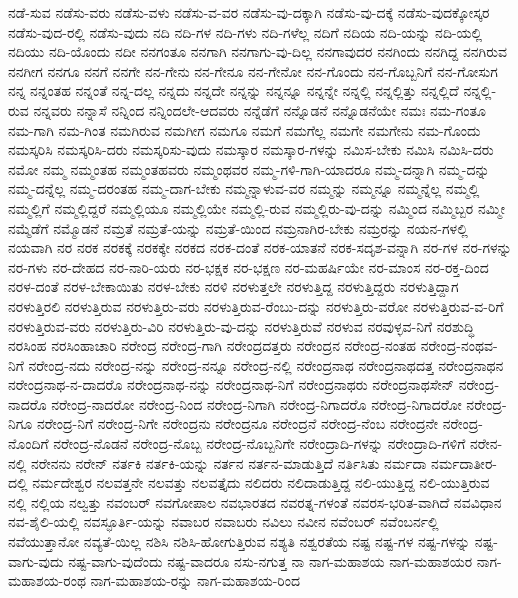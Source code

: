 {ನಡೆ-ಸುವ
ನಡೆಸು-ವರು
ನಡೆಸು-ವಳು
ನಡೆಸು-ವ-ವರ
ನಡೆಸು-ವು-ದಕ್ಕಾಗಿ
ನಡೆಸು-ವು-ದಕ್ಕೆ
ನಡೆಸು-ವುದಕ್ಕೋಸ್ಕರ
ನಡೆಸು-ವುದ-ರಲ್ಲಿ
ನಡೆಸು-ವುದು
ನದಿ
ನದಿ-ಗಳ
ನದಿ-ಗಳು
ನದಿ-ಗಳೆಲ್ಲ
ನದಿಗೆ
ನದಿಯ
ನದಿ-ಯನ್ನು
ನದಿ-ಯಲ್ಲಿ
ನದಿಯು
ನದಿ-ಯೊಂದು
ನದೀ
ನನಗಂತೂ
ನನಗಾಗಿ
ನನಗಾಗು-ವು-ದಿಲ್ಲ
ನನಗಾವುದರ
ನನಗಿಂದು
ನನಗಿದ್ದ
ನನಗಿರುವ
ನನಗೀಗ
ನನಗೂ
ನನಗೆ
ನನಗೇ
ನನ-ಗೇನು
ನನ-ಗೇನೂ
ನನ-ಗೇನೋ
ನನ-ಗೊಂದು
ನನ-ಗೊಬ್ಬನಿಗೆ
ನನ-ಗೋಸುಗ
ನನ್ನ
ನನ್ನಂತಹ
ನನ್ನಂತೆ
ನನ್ನ-ದಲ್ಲ
ನನ್ನದು
ನನ್ನದೇ
ನನ್ನನ್ನು
ನನ್ನನ್ನೂ
ನನ್ನನ್ನೇ
ನನ್ನಲ್ಲಿ
ನನ್ನಲ್ಲಿತ್ತು
ನನ್ನಲ್ಲಿದೆ
ನನ್ನಲ್ಲಿ-ರುವ
ನನ್ನವರು
ನನ್ನಾಸೆ
ನನ್ನಿಂದ
ನನ್ನಿಂದಲೇ-ಆದವರು
ನನ್ನೆಡೆಗೆ
ನನ್ನೊಡನೆ
ನನ್ನೊಡನೆಯೇ
ನಮಃ
ನಮ-ಗಂತೂ
ನಮ-ಗಾಗಿ
ನಮ-ಗಿಂತ
ನಮಗಿರುವ
ನಮಗೀಗ
ನಮಗೂ
ನಮಗೆ
ನಮಗೆಲ್ಲ
ನಮಗೇ
ನಮಗೇನು
ನಮ-ಗೊಂದು
ನಮಸ್ಕರಿಸಿ
ನಮಸ್ಕರಿಸಿ-ದರು
ನಮಸ್ಕರಿಸು-ವುದು
ನಮಸ್ಕಾರ
ನಮಸ್ಕಾರ-ಗಳನ್ನು
ನಮಿಸ-ಬೇಕು
ನಮಿಸಿ
ನಮಿಸಿ-ದರು
ನಮೋ
ನಮ್ಮ
ನಮ್ಮಂತಹ
ನಮ್ಮಂತಹವರು
ನಮ್ಮಂಥವರ
ನಮ್ಮ-ಗಳಿ-ಗಾಗಿ-ಯಾದರೂ
ನಮ್ಮ-ದನ್ನಾಗಿ
ನಮ್ಮ-ದನ್ನು
ನಮ್ಮ-ದನ್ನೆಲ್ಲ
ನಮ್ಮ-ದರಂತಹ
ನಮ್ಮ-ದಾಗ-ಬೇಕು
ನಮ್ಮನ್ನಾಳುವ-ವರ
ನಮ್ಮನ್ನು
ನಮ್ಮನ್ನೂ
ನಮ್ಮನ್ನೆಲ್ಲ
ನಮ್ಮಲ್ಲಿ
ನಮ್ಮಲ್ಲಿಗೆ
ನಮ್ಮಲ್ಲಿದ್ದರೆ
ನಮ್ಮಲ್ಲಿಯೂ
ನಮ್ಮಲ್ಲಿಯೇ
ನಮ್ಮಲ್ಲಿ-ರುವ
ನಮ್ಮಲ್ಲಿರು-ವು-ದನ್ನು
ನಮ್ಮಿಂದ
ನಮ್ಮಿಬ್ಬರ
ನಮ್ಮೀ
ನಮ್ಮೆಡೆಗೆ
ನಮ್ಮೊಡನೆ
ನಮ್ರತೆ
ನಮ್ರತೆ-ಯನ್ನು
ನಮ್ರತೆ-ಯಿಂದ
ನಮ್ರನಾಗಿರ-ಬೇಕು
ನಮ್ರರನ್ನು
ನಯನ-ಗಳಲ್ಲಿ
ನಯವಾಗಿ
ನರ
ನರಕ
ನರಕಕ್ಕೆ
ನರಕಕ್ಕೇ
ನರಕದ
ನರಕ-ದಂತೆ
ನರಕ-ಯಾತನೆ
ನರಕ-ಸದೃಶ-ವನ್ನಾಗಿ
ನರ-ಗಳ
ನರ-ಗಳನ್ನು
ನರ-ಗಳು
ನರ-ದೇಹದ
ನರ-ನಾರಿ-ಯರು
ನರ-ಭಕ್ಷಕ
ನರ-ಭಕ್ಷಣ
ನರ-ಮಹರ್ಷಿಯೇ
ನರ-ಮಾಂಸ
ನರ-ರಕ್ತ-ದಿಂದ
ನರಳ-ದಂತೆ
ನರಳ-ಬೇಕಾಯಿತು
ನರಳ-ಬೇಕು
ನರಳಿ
ನರಳುತ್ತಲೇ
ನರಳುತ್ತಿದ್ದ
ನರಳುತ್ತಿದ್ದರು
ನರಳುತ್ತಿದ್ದಾಗ
ನರಳುತ್ತಿರಲಿ
ನರಳುತ್ತಿರುವ
ನರಳುತ್ತಿರು-ವರು
ನರಳುತ್ತಿರುವ-ರೆಂಬು-ದನ್ನು
ನರಳುತ್ತಿರು-ವರೋ
ನರಳುತ್ತಿರುವ-ವ-ರಿಗೆ
ನರಳುತ್ತಿರುವ-ವರು
ನರಳುತ್ತಿರು-ವಿರಿ
ನರಳುತ್ತಿರು-ವು-ದನ್ನು
ನರಳುತ್ತಿರುವೆ
ನರಳುವ
ನರವುಳ್ಳವ-ನಿಗೆ
ನರಶುದ್ಧಿ
ನರಸಿಂಹ
ನರಸಿಂಹಾಚಾರಿ
ನರೇಂದ್ರ
ನರೇಂದ್ರ-ಗಾಗಿ
ನರೇಂದ್ರದತ್ತರು
ನರೇಂದ್ರನ
ನರೇಂದ್ರ-ನಂತಹ
ನರೇಂದ್ರ-ನಂಥವ-ನಿಗೆ
ನರೇಂದ್ರ-ನದು
ನರೇಂದ್ರ-ನನ್ನು
ನರೇಂದ್ರ-ನನ್ನೂ
ನರೇಂದ್ರ-ನಲ್ಲಿ
ನರೇಂದ್ರನಾಥ
ನರೇಂದ್ರನಾಥದತ್ತ
ನರೇಂದ್ರನಾಥನ
ನರೇಂದ್ರನಾಥ-ನ-ದಾದರೊ
ನರೇಂದ್ರನಾಥ-ನನ್ನು
ನರೇಂದ್ರನಾಥ-ನಿಗೆ
ನರೇಂದ್ರನಾಥರು
ನರೇಂದ್ರನಾಥಸೇನ್
ನರೇಂದ್ರ-ನಾದರೊ
ನರೇಂದ್ರ-ನಾದರೋ
ನರೇಂದ್ರ-ನಿಂದ
ನರೇಂದ್ರ-ನಿಗಾಗಿ
ನರೇಂದ್ರ-ನಿಗಾದರೊ
ನರೇಂದ್ರ-ನಿಗಾದರೋ
ನರೇಂದ್ರ-ನಿಗೂ
ನರೇಂದ್ರ-ನಿಗೆ
ನರೇಂದ್ರ-ನಿಗೇ
ನರೇಂದ್ರನು
ನರೇಂದ್ರನೂ
ನರೇಂದ್ರನೆ
ನರೇಂದ್ರ-ನೆಂಬ
ನರೇಂದ್ರನೇ
ನರೇಂದ್ರ-ನೊಂದಿಗೆ
ನರೇಂದ್ರ-ನೊಡನೆ
ನರೇಂದ್ರ-ನೊಬ್ಬ
ನರೇಂದ್ರ-ನೊಬ್ಬನಿಗೇ
ನರೇಂದ್ರಾದಿ-ಗಳನ್ನು
ನರೇಂದ್ರಾದಿ-ಗಳಿಗೆ
ನರೇನ-ನಲ್ಲಿ
ನರೇನನು
ನರೇನ್
ನರ್ತಕಿ
ನರ್ತಕಿ-ಯನ್ನು
ನರ್ತನ
ನರ್ತನ-ಮಾಡುತ್ತಿದೆ
ನರ್ತಿಸಿತು
ನರ್ಮದಾ
ನರ್ಮದಾತೀರ-ದಲ್ಲಿ
ನರ್ಮದೇಶ್ವರ
ನಲವತ್ತನೇ
ನಲವತ್ತು
ನಲವತ್ತೈದು
ನಲಿದರು
ನಲಿದಾಡುತ್ತಿದ್ದ
ನಲಿ-ಯುತ್ತಿದ್ದ
ನಲಿ-ಯುತ್ತಿರುವ
ನಲ್ಲಿ
ನಲ್ಲಿಯ
ನಲ್ವತ್ತು
ನವಂಬರ್
ನವಗೋಪಾಲ
ನವಭಾರತದ
ನವರತ್ನ-ಗಳಂತೆ
ನವರಸ-ಭರಿತ-ವಾಗಿದೆ
ನವವಿಧಾನ
ನವ-ಶೈಲಿ-ಯಲ್ಲಿ
ನವಸ್ಫೂರ್ತಿ-ಯನ್ನು
ನವಾಬರ
ನವಾಬರು
ನವಿಲು
ನವೀನ
ನವೆಂಬರ್
ನವೆಂಬರ್ನಲ್ಲಿ
ನವೆಯುತ್ತಾನೋ
ನವ್ಯತೆ-ಯಿಲ್ಲ
ನಶಿಸಿ
ನಶಿಸಿ-ಹೋಗುತ್ತಿರುವ
ನಶ್ಯತಿ
ನಶ್ವರತೆಯ
ನಷ್ಟ
ನಷ್ಟ-ಗಳ
ನಷ್ಟ-ಗಳನ್ನು
ನಷ್ಟ-ವಾಗು-ವುದು
ನಷ್ಟ-ವಾಗು-ವುದೆಂದು
ನಷ್ಟ-ವಾದರೂ
ನಸು-ನಗುತ್ತ
ನಾ
ನಾಗ-ಮಹಾಶಯ
ನಾಗ-ಮಹಾಶಯರ
ನಾಗ-ಮಹಾಶಯ-ರಂಥ
ನಾಗ-ಮಹಾಶಯ-ರನ್ನು
ನಾಗ-ಮಹಾಶಯ-ರಿಂದ
}
